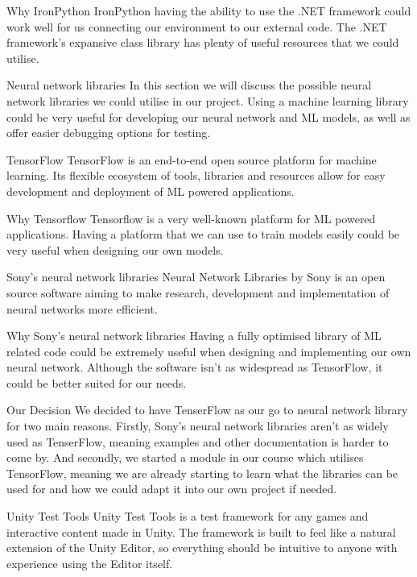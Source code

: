 Why IronPython
IronPython having the ability to use the .NET framework could work well for us connecting our environment to our external code. The .NET framework’s expansive class library has plenty of useful resources that we could utilise.









Neural network libraries
In this section we will discuss the possible neural network libraries we could utilise in our project. Using a machine learning library could be very useful for developing our neural network and ML models, as well as offer easier debugging options for testing.

TensorFlow
TensorFlow is an end-to-end open source platform for machine learning. Its flexible ecosystem of tools, libraries and resources allow for easy development and deployment of ML powered applications.

Why Tensorflow
Tensorflow is a very well-known platform for ML powered applications. Having a platform that we can use to train models easily could be very useful when designing our own models.

Sony’s neural network libraries
Neural Network Libraries by Sony is an open source software aiming to make research, development and implementation of neural networks more efficient.

Why Sony’s neural network libraries
Having a fully optimised library of ML related code could be extremely useful when designing and implementing our own neural network. Although the software isn’t as widespread as TensorFlow, it could be better suited for our needs.

Our Decision
We decided to have TenserFlow as our go to neural network library for two main reasons. Firstly, Sony’s neural network libraries aren’t as widely used as TenserFlow, meaning examples and other documentation is harder to come by. And secondly, we started a module in our course which utilises TensorFlow, meaning we are already starting to learn what the libraries can be used for and how we could adapt it into our own project if needed.

Unity Test Tools 
Unity Test Tools is a test framework for any games and interactive content made in Unity. The framework is built to feel like a natural extension of the Unity Editor, so everything should be intuitive to anyone with experience using the Editor itself.


